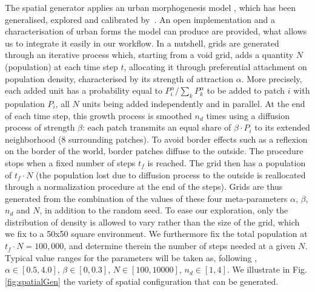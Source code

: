 \documentclass[Royal,sageh,times]{sagej}
\begin{document}
The spatial generator applies an urban morphogenesis model \citep{Batty2007}, which has been generalised, explored and calibrated by~\citet{2017arXiv170806743R}. An open implementation and a characterisation of urban forms the model can produce are provided, what allows us to integrate it easily in our workflow. In a nutshell, grids are generated through an iterative process which, starting from a void grid, adds a quantity $N$ (population) at each time step $t$, allocating it through preferential attachment on population density, characterised by its strength of attraction $\alpha$. More precisely, each added unit has a probability equal to $P_i^{\alpha}/\sum_k P_k^{\alpha}$ to be added to patch $i$ with population $P_i$, all $N$ units being added independently and in parallel. At the end of each time step, this growth process is smoothed $n_d$ times using a diffusion process of strength $\beta$: each patch transmits an equal share of $\beta\cdot P_i$ to its extended neighborhood (8 surrounding patches). To avoid border effects such as a reflexion on the border of the world, border patches diffuse to the outside. The procedure stops when a fixed number of steps $t_f$ is reached. The grid then has a population of $t_f \cdot N$ (the population lost due to diffusion process to the outside is reallocated through a normalization procedure at the end of the steps). Grids are thus generated from the combination of the values of these four meta-parameters $\alpha$, $\beta$, $n_d$ and $N$, in addition to the random seed. To ease our exploration, only the distribution of density is allowed to vary rather than the size of the grid, which we fix to a 50x50 square environment. We furthermore fix the total population at $t_f\cdot N = 100,000$, and determine therein the number of steps needed at a given $N$. Typical value ranges for the  parameters will be taken as, following \citet{2017arXiv170806743R}, $\alpha\in\left[0.5,4.0\right]$, $\beta \in\left[0,0.3\right] $, $N\in \left[100,10000\right]$, $n_d\in\left[1,4\right]$. We illustrate in Fig.\ref{fig:spatialGen} the variety of spatial configuration that can be generated.

\end{document}
